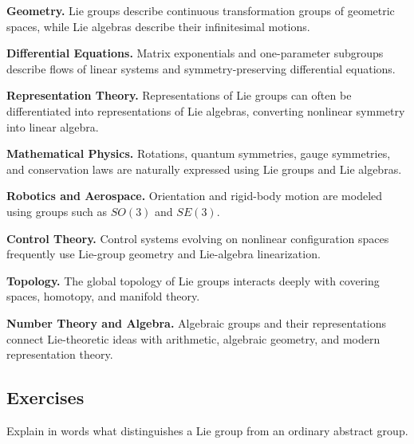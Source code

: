 \begin{applicationbox}
\textbf{Geometry.}
Lie groups describe continuous transformation groups of geometric spaces,
while Lie algebras describe their infinitesimal motions.

\medskip

\textbf{Differential Equations.}
Matrix exponentials and one-parameter subgroups describe flows of linear
systems and symmetry-preserving differential equations.

\medskip

\textbf{Representation Theory.}
Representations of Lie groups can often be differentiated into
representations of Lie algebras, converting nonlinear symmetry into linear
algebra.

\medskip

\textbf{Mathematical Physics.}
Rotations, quantum symmetries, gauge symmetries, and conservation laws are
naturally expressed using Lie groups and Lie algebras.

\medskip

\textbf{Robotics and Aerospace.}
Orientation and rigid-body motion are modeled using groups such as
\(SO(3)\) and \(SE(3)\).

\medskip

\textbf{Control Theory.}
Control systems evolving on nonlinear configuration spaces frequently use
Lie-group geometry and Lie-algebra linearization.

\medskip

\textbf{Topology.}
The global topology of Lie groups interacts deeply with covering spaces,
homotopy, and manifold theory.

\medskip

\textbf{Number Theory and Algebra.}
Algebraic groups and their representations connect Lie-theoretic ideas with
arithmetic, algebraic geometry, and modern representation theory.
\end{applicationbox}

\subsection{Exercises}
\label{subsec:lie-theory-exercises}

\begin{exercise}[1]
Explain in words what distinguishes a Lie group from an ordinary abstract
group.
\end{exercise}

